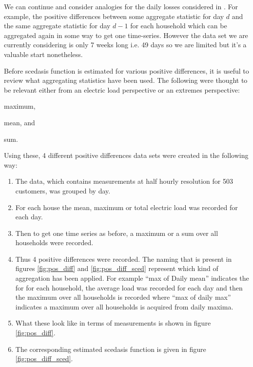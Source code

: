 \documentclass[a4paper]{article}
\begin{document}


We can continue and consider analogies for the daily losses considered in \cite{einmahl16}. For example, the positive differences between some aggregate statistic for day $d$ and the same aggregate statistic for day $d-1$ for each household which can be aggregated again in some way to get one time-series. However the data set we are currently considering is only 7 weeks long i.e. 49 days so we are limited but it's a valuable start nonetheless.

Before scedasis function is estimated for various positive differences, it is useful to review what aggregating statistics have been used. The following were thought to be relevant either from an electric load perspective or an extremes perspective: \begin{enumerate*}[label=\roman*)] \item maximum, \item mean, and \item sum. \end{enumerate*} Using these, 4 different positive differences data sets were created in the following way:
\begin{enumerate}
\item The data, which contains measurements at half hourly resolution for 503 customers, was grouped by day.
\item For each house the mean, maximum or total electric load was recorded for each day.
\item Then to get one time series as before, a maximum or a sum over all households were recorded.
\item Thus 4 positive differences were recorded. The naming that is present in figures \ref{fig:pos_diff} and \ref{fig:pos_diff_sced} represent which kind of aggregation has been applied. For example ``max of Daily mean'' indicates the for for each household, the average load was recorded for each day and then the maximum  over all households is recorded where ``max of daily max'' indicates a maximum over all households is acquired from daily maxima.
\item What these look like in terms of measurements is shown in figure \ref{fig:pos_diff}.
\item The corresponding estimated scedasis function is given in figure \ref{fig:pos_diff_sced}.
\end{enumerate}
\end{document}
